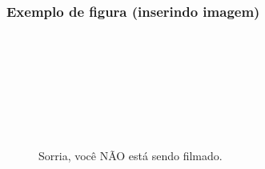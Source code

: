 \begin{frame}
  \frametitle{Exemplo de figura (inserindo imagem)}

  \begin{exemplo}
    \medskip
    \quad
    \begin{minipage}{10cm}
    \texttt{\purple{\string\usepackage}
      \qquad
      }
    \bigskip
    
    \begin{ttfamily}\small
        \red{[hb]}\\
          \mbox{}\ \ \purple{\string\centering}\\
          \mbox{}\ \ \brown{[width=2cm]}\\
          \mbox{}\ \ \purple{\string\caption}\\
          \mbox{}\ \ \purple{\string\label}\\
      \end{ttfamily}
    \end{minipage}
    
    \begin{figure}[hb]
      \centering
      \caption{Sorria, você NÃO está sendo filmado.}
      \label{fig:smiley}
    \end{figure}

  \end{exemplo}

\end{frame}


